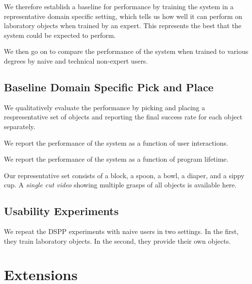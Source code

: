 \documentclass[12pt]{article}
\numberwithin{equation}{section}
\numberwithin{table}{section}
\numberwithin{figure}{section}
\begin{document}
We therefore establish a baseline for performance by training the system in a representative domain
specific setting, which tells us how well it can perform on laboratory objects when trained by an 
expert. This represents the best that the system could be expected to perform.

We then go on to compare the performance of the system when trained to various degrees by naive
and technical non-expert users.

\subsection{Baseline Domain Specific Pick and Place}
We qualitatively evaluate the performance by picking and placing
a respresentative set of objects and reporting the final success rate for each 
object separately.

We report the performance of the system as a function of user interactions.

We report the performance of the system as a function of program lifetime.

Our representative set consists of a block, a spoon,
a bowl, a diaper, and a sippy cup. A \emph{single cut video} showing multiple grasps
of all objects is available here.

\subsection{Usability Experiments}
We repeat the DSPP experiments with naive users in two settings. In the first, they train laboratory
objects. In the second, they provide their own objects.


\section{Extensions}


\newpage



\end{document}
